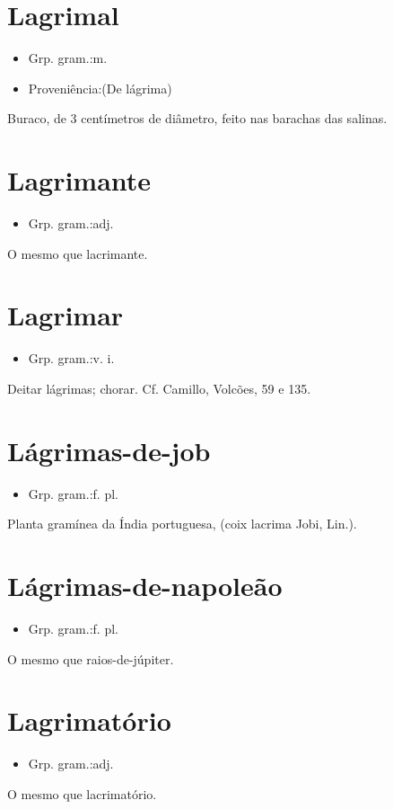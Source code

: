 \section{Lagrimal}
\begin{itemize}
\item {Grp. gram.:m.}
\end{itemize}
\begin{itemize}
\item {Proveniência:(De \textunderscore lágrima\textunderscore )}
\end{itemize}
Buraco, de 3 centímetros de diâmetro, feito nas barachas das salinas.
\section{Lagrimante}
\begin{itemize}
\item {Grp. gram.:adj.}
\end{itemize}
O mesmo que \textunderscore lacrimante\textunderscore .
\section{Lagrimar}
\begin{itemize}
\item {Grp. gram.:v. i.}
\end{itemize}
Deitar lágrimas; chorar. Cf. Camillo, \textunderscore Volcões\textunderscore , 59 e 135.
\section{Lágrimas-de-job}
\begin{itemize}
\item {Grp. gram.:f. pl.}
\end{itemize}
Planta gramínea da Índia portuguesa, (\textunderscore coix lacrima Jobi\textunderscore , Lin.).
\section{Lágrimas-de-napoleão}
\begin{itemize}
\item {Grp. gram.:f. pl.}
\end{itemize}
O mesmo que \textunderscore raios-de-júpiter\textunderscore .
\section{Lagrimatório}
\begin{itemize}
\item {Grp. gram.:adj.}
\end{itemize}
O mesmo que \textunderscore lacrimatório\textunderscore .
